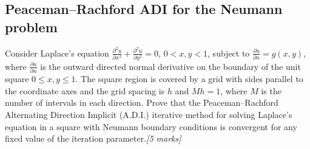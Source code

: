 \documentclass[11pt,a4paper]{article}
\newcommand{\mk}[1]{\hfill\textit{[#1 marks]}}
\newcommand{\pd}[2]{\frac{\partial #1}{\partial #2}}
\newcommand{\pdd}[2]{\frac{\partial^2 #1}{\partial #2^2}}
\begin{document}
\subsection{Peaceman--Rachford ADI for the Neumann problem}

\begin{qbox}
Consider Laplace's equation
\(\pdd ux+\pdd uy=0\), \(0<x,y<1\), subject to \(\pd un=g(x,y)\),
where \(\pd un\) is the outward directed normal derivative on the
boundary of the unit square \(0\le x,y\le1\).  The square region is
covered by a grid with sides parallel to the coordinate axes and the
grid spacing is \(h\) and \(Mh=1\), where \(M\) is the number of
intervals in each direction.  Prove that the Peaceman--Rachford
Alternating Direction Implicit (A.D.I.) iterative method for solving
Laplace's equation in a square with Neumann boundary conditions is
convergent for any fixed value of the iteration parameter.\mk{5}
\end{qbox}
\end{document}
